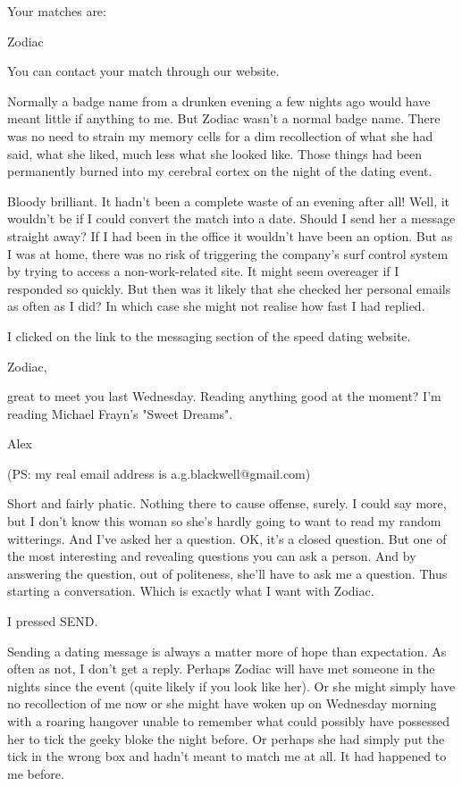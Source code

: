 \startmessage
Your matches are:

Zodiac

You can contact your match through our website.
\stopmessage

Normally a badge name from a drunken evening a few nights ago would
have meant little if anything to me. But Zodiac wasn't a normal
badge name. There was no need to strain my memory cells for a dim
recollection of what she had said, what she liked, much less what
she looked like. Those things had been permanently burned into my
cerebral cortex on the night of the dating event.

Bloody brilliant. It hadn't been a complete waste of an evening
after all! Well, it wouldn't be if I could convert the match into a
date. Should I send her a message straight away? If I had been in
the office it wouldn't have been an option. But as I was at home,
there was no risk of triggering the company's surf control system by
trying to access a non-work-related site. It might seem overeager if
I responded so quickly. But then was it likely that she checked her
personal emails as often as I did? In which case she might not
realise how fast I had replied.

I clicked on the link to the messaging section of the speed dating
website.

\startmessage
Zodiac,

great to meet you last Wednesday. Reading anything good at the
moment? I'm reading Michael Frayn's "Sweet Dreams".

Alex

(PS: my real email address is a.g.blackwell@gmail.com)
\stopmessage

Short and fairly phatic. Nothing there to cause offense, surely. I
could say more, but I don't know this woman so she's hardly going to
want to read my random witterings. And I've asked her a question.
OK, it's a closed question. But one of the most interesting and
revealing questions you can ask a person. And by answering the
question, out of politeness, she'll have to ask me a question. Thus
starting a conversation. Which is exactly what I want with Zodiac.

I pressed {\twelvett SEND}.

Sending a dating message is always a matter more of hope than
expectation. As often as not, I don't get a reply. Perhaps Zodiac
will have met someone in the nights since the event (quite likely if
you look like her). Or she might simply have no recollection of me
now or she might have woken up on Wednesday morning with a roaring
hangover unable to remember what could possibly have possessed her
to tick the geeky bloke the night before. Or perhaps she had simply
put the tick in the wrong box and hadn't meant to match me at all.
It had happened to me before.

